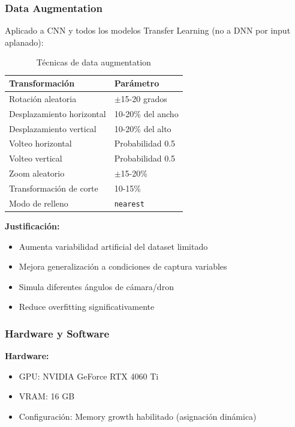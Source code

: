 \documentclass[11pt, a4paper]{article}
\begin{document}
\subsubsection{Data Augmentation}

Aplicado a CNN y todos los modelos Transfer Learning (no a DNN por input aplanado):

\begin{table}[H]
\centering
\caption{Técnicas de data augmentation}
\label{tab:data_augmentation}
\begin{tabular}{@{}ll@{}}
\toprule
\textbf{Transformación} & \textbf{Parámetro} \\
\midrule
Rotación aleatoria            & $\pm$15-20 grados \\
Desplazamiento horizontal     & 10-20\% del ancho \\
Desplazamiento vertical       & 10-20\% del alto \\
Volteo horizontal             & Probabilidad 0.5 \\
Volteo vertical               & Probabilidad 0.5 \\
Zoom aleatorio                & $\pm$15-20\% \\
Transformación de corte       & 10-15\% \\
Modo de relleno               & \texttt{nearest} \\
\bottomrule
\end{tabular}
\end{table}

\textbf{Justificación:}
\begin{itemize}
    \item Aumenta variabilidad artificial del dataset limitado
    \item Mejora generalización a condiciones de captura variables
    \item Simula diferentes ángulos de cámara/dron
    \item Reduce overfitting significativamente
\end{itemize}

\subsubsection{Hardware y Software}

\textbf{Hardware:}
\begin{itemize}
    \item GPU: NVIDIA GeForce RTX 4060 Ti
    \item VRAM: 16 GB
    \item Configuración: Memory growth habilitado (asignación dinámica)
\end{itemize}
\end{document}
